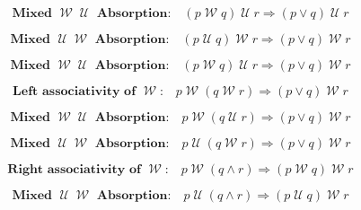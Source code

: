 \documentclass[12pt, fleqn, leqno]{article}
\newcommand{\impl}{\ensuremath{\Rightarrow}}        %
\newcommand{\Until}{\;\mathcal{U}\;}
\newcommand{\Wait}{\;\mathcal{W}\;}
\newcommand{\spacer}{\vspace{-30pt}}
\begin{document}
\begin{equation}\label{E:mixuntilImpAbsR}
\textbf{Mixed $\Wait\Until$ Absorption:}\quad (p \Wait q) \Until r \impl (p \lor q) \Until r
\end{equation}

\spacer

\begin{equation}\label{E:mix2untilImpAbsR}
\textbf{Mixed $\Until\Wait$ Absorption:}\quad (p \Until q) \Wait r \impl (p \lor q) \Wait r
\end{equation}

\spacer
\begin{equation}\label{E:mix3untilImpAbsR}
\textbf{Mixed $\Wait\Until$ Absorption:}\quad (p \Wait q) \Until r \impl (p \lor q) \Wait r
\end{equation}

\spacer
\begin{equation}\label{E:leftAssocWait}
\textbf{Left associativity of $\Wait$:}\quad p \Wait (q \Wait r) \impl (p \lor q) \Wait r
\end{equation}

\spacer

\begin{equation}\label{E:mix4untilImpAbsR}
\textbf{Mixed $\Wait\Until$ Absorption:}\quad p \Wait (q \Until r) \impl (p \lor q) \Wait r
\end{equation}

\spacer

\begin{equation}\label{E:mix5untilImpAbsR}
\textbf{Mixed $\Until\Wait$ Absorption:}\quad p \Until (q \Wait r) \impl (p \lor q) \Wait r
\end{equation}

\spacer

\begin{equation}\label{E:rightAssocWait}
\textbf{Right associativity of $\Wait$:}\quad p \Wait (q \land r) \impl (p \Wait q) \Wait r
\end{equation}

\spacer

\begin{equation}\label{E:mix6untilImpAbsR}
\textbf{Mixed $\Until\Wait$ Absorption:}\quad p \Until (q \land r) \impl (p \Until q) \Wait r
\end{equation}

\spacer
\end{document}
